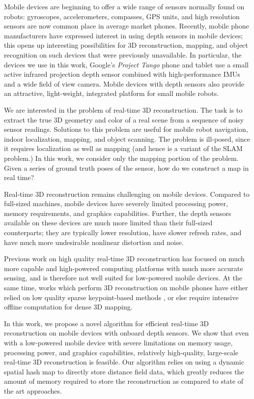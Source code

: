 \documentclass[10pt,twocolumn,letterpaper]{article}
\begin{document}
Mobile devices are beginning to offer a wide range of sensors normally found on
robots: gyroscopes, accelerometers, compasses, GPS units, and high resolution
sensors are now common place in average market phones. Recently, mobile phone
manufacturers have expressed interest in using depth sensors in mobile devices;
this opens up interesting possibilities for 3D reconstruction, mapping,
and object recognition on such devices that were previously unavailable. In
particular, the devices we use in this work, Google's \textit{Project Tango} 
\cite{Tango} phone
and tablet use a small active infrared projection depth sensor combined with
high-performance IMUs and a wide field of view camera. Mobile devices with depth
sensors also provide an attractive, light-weight, integrated platform for small mobile robots.

We are interested in the problem of real-time 3D reconstruction. The task is to
extract the true 3D geometry and color of a real scene from a sequence of noisy
sensor readings. Solutions to this problem are useful for mobile robot navigation,
indoor localization, mapping, and object scanning. The problem is ill-posed,
since it requires localization as well as mapping (and hence is a variant of
the SLAM problem.) In this work, we consider only the mapping portion of the
problem. Given a series of ground truth poses of the sensor, how do we construct
a map in real time?

Real-time 3D reconstruction remains challenging on mobile devices. Compared to
full-sized machines, mobile devices have severely limited processing power,
memory requirements, and graphics capabilities. Further, the depth sensors
available on these devices are much more limited than their full-sized
counterparts; they are typically lower resolution, have slower refresh rates,
and have much more undesirable nonlinear distortion and noise.

Previous work on high quality real-time 3D reconstruction \cite{Newcombe,
Whelan2013, Bylow2013, DTAM} has focused on much more capable and high-powered
computing platforms with much more accurate sensing, and is therefore not well
suited for low-powered mobile devices. At the same time, works which perform 3D
reconstruction on mobile phones have either relied on low quality sparse
keypoint-based methods \cite{KleinSparse}, or else require intensive offline
computation \cite{TanskanenMetric} for dense 3D mapping.

In this work, we propose a novel algorithm for efficient real-time 3D
reconstruction on mobile devices with onboard depth sensors. We show that even
with a low-powered mobile device with severe limitations on memory usage,
processing power, and graphics capabilities, relatively high-quality,
large-scale real-time 3D reconstruction is feasible. Our algorithm relies on
using a dynamic spatial hash map \cite{SpatialHashing} to directly store
distance field data, which greatly reduces the amount of memory required to
store the reconstruction as compared to state of the art approaches.
\end{document}

